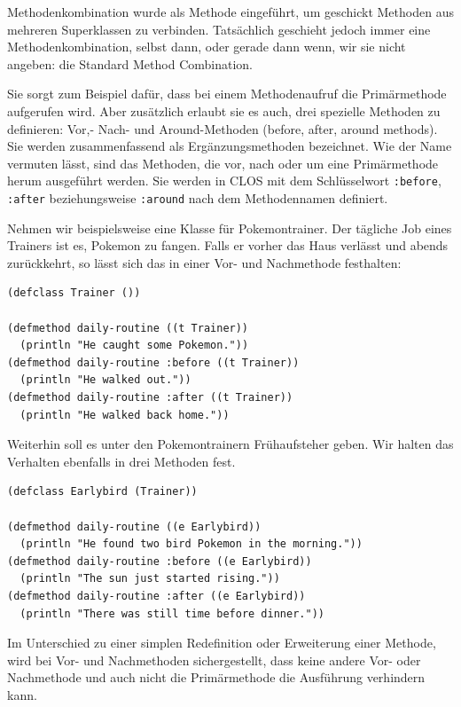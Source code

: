 Methodenkombination wurde als Methode eingeführt, um geschickt Methoden aus mehreren Superklassen zu verbinden. Tatsächlich geschieht jedoch immer eine Methodenkombination, selbst dann, oder gerade dann wenn, wir sie nicht angeben: die Standard Method Combination.

Sie sorgt zum Beispiel dafür, dass bei einem Methodenaufruf die Primärmethode aufgerufen wird. Aber zusätzlich erlaubt sie es auch, drei spezielle Methoden zu definieren: Vor,- Nach- und Around-Methoden (before, after, around methods). Sie werden zusammenfassend als Ergänzungsmethoden  bezeichnet. Wie der Name vermuten lässt, sind das Methoden, die vor, nach oder um eine Primärmethode herum ausgeführt werden. Sie werden in CLOS mit dem Schlüsselwort \texttt{:before}, \texttt{:after} beziehungsweise \texttt{:around} nach dem Methodennamen definiert.

Nehmen wir beispielsweise eine Klasse für Pokemontrainer. Der tägliche Job eines Trainers ist es, Pokemon zu fangen. Falls er vorher das Haus verlässt und abends zurückkehrt, so lässt sich das in einer Vor- und Nachmethode festhalten:

\begin{lstlisting}
(defclass Trainer ())

(defmethod daily-routine ((t Trainer))
  (println "He caught some Pokemon."))
(defmethod daily-routine :before ((t Trainer))
  (println "He walked out."))
(defmethod daily-routine :after ((t Trainer))
  (println "He walked back home."))
\end{lstlisting}

Weiterhin soll es unter den Pokemontrainern Frühaufsteher geben. Wir halten das Verhalten ebenfalls in drei Methoden fest.

\begin{lstlisting}
(defclass Earlybird (Trainer))

(defmethod daily-routine ((e Earlybird))
  (println "He found two bird Pokemon in the morning."))
(defmethod daily-routine :before ((e Earlybird))
  (println "The sun just started rising."))
(defmethod daily-routine :after ((e Earlybird))
  (println "There was still time before dinner."))
\end{lstlisting}

Im Unterschied zu einer simplen Redefinition oder Erweiterung einer Methode, wird bei Vor- und Nachmethoden sichergestellt, dass keine andere Vor- oder Nachmethode und auch nicht die Primärmethode die Ausführung verhindern kann.

